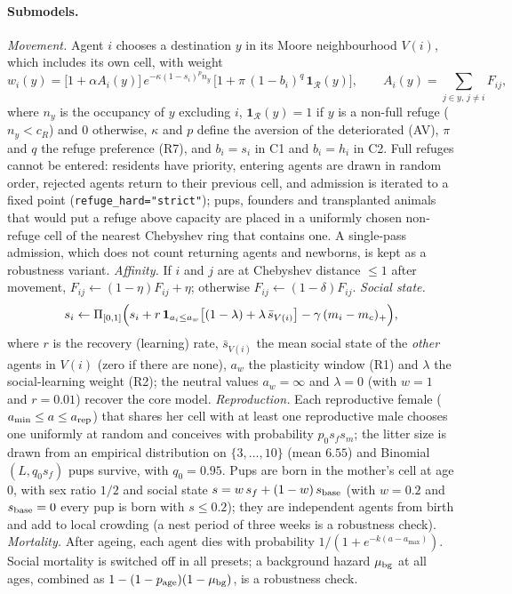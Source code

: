 \documentclass[pre,onecolumn,superscriptaddress,notitlepage]{revtex4-2}
\begin{document}
\paragraph{Submodels.}
\emph{Movement.} Agent $i$ chooses a destination $y$ in its Moore neighbourhood $V(i)$, which includes its own
cell, with weight
\[
w_i(y)=\bigl[1+\alpha A_i(y)\bigr]\,e^{-\kappa(1-s_i)^{p}n_y}\,
\bigl[1+\pi\,(1-b_i)^{q}\,\mathbf 1_{\mathcal R}(y)\bigr],\qquad
A_i(y)=\sum_{j\in y,\,j\ne i}F_{ij},
\]
where $n_y$ is the occupancy of $y$ excluding $i$, $\mathbf 1_{\mathcal R}(y)=1$ if $y$ is a non-full refuge
($n_y<c_R$) and 0 otherwise, $\kappa$ and $p$ define the aversion of the deteriorated (AV),
$\pi$ and $q$ the refuge preference (R7), and $b_i=s_i$ in \textsf{C1} and $b_i=h_i$ in \textsf{C2}. Full refuges
cannot be entered: residents have priority, entering agents are drawn in random order, rejected agents return to
their previous cell, and admission is iterated to a fixed point (\texttt{refuge\_hard="strict"}); pups, founders
and transplanted animals that would put a refuge above capacity are placed in a uniformly chosen non-refuge cell
of the nearest Chebyshev ring that contains one. A single-pass admission, which does not count returning agents and newborns, is kept as a robustness variant.
\emph{Affinity.} If $i$ and $j$ are at Chebyshev distance $\le1$ after movement, $F_{ij}\leftarrow(1-\eta)F_{ij}+\eta$;
otherwise $F_{ij}\leftarrow(1-\delta)F_{ij}$.
\emph{Social state.}
\[
s_i\leftarrow\Pi_{[0,1]}\Bigl(s_i+r\,\mathbf 1_{a_i\le a_w}\bigl[(1-\lambda)+\lambda\,\bar s_{V(i)}\bigr]
-\gamma\,(m_i-m_c)_+\Bigr),
\]
where $r$ is the recovery (learning) rate, $\bar s_{V(i)}$ the mean social state of the \emph{other} agents in
$V(i)$ (zero if there are none), $a_w$ the plasticity window (R1) and $\lambda$ the social-learning weight (R2); the
neutral values $a_w=\infty$ and $\lambda=0$ (with $w=1$ and $r=0.01$) recover the core model.
\emph{Reproduction.} Each reproductive female ($a_{\min}\le a\le a_{\rm rep}$) that shares her cell with at least
one reproductive male chooses one uniformly at random and conceives with probability $p_0s_fs_m$; the litter size
is drawn from an empirical distribution on $\{3,\dots,10\}$ (mean $6.55$) and Binomial$(L,q_0s_f)$ pups survive,
with $q_0=0.95$. Pups are born in the mother's cell at age 0, with sex ratio $1/2$ and social state
$s=w\,s_f+(1-w)\,s_{\rm base}$ (with $w=0.2$ and $s_{\rm base}=0$ every pup is born with $s\le0.2$); they are
independent agents from birth and add to local crowding (a nest period of three weeks is a robustness check).
\emph{Mortality.} After ageing, each agent dies with probability $1/(1+e^{-k(a-a_{\max})})$. Social mortality is
switched off in all presets; a background hazard $\mu_{\rm bg}$ at all ages, combined as
$1-(1-p_{\rm age})(1-\mu_{\rm bg})$, is a robustness check.
\end{document}
